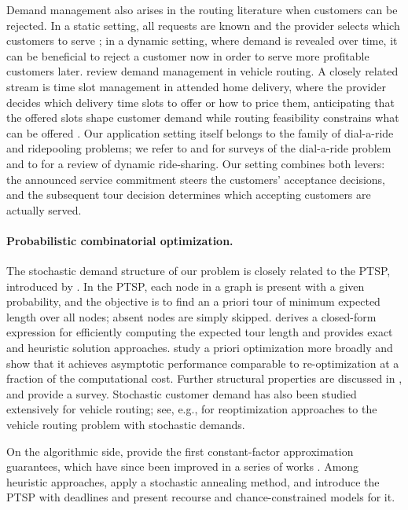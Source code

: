 \documentclass[11pt]{article}
\theoremstyle{plain}
\theoremstyle{definition}
\begin{document}
    Demand management also arises in the routing literature when customers can be rejected. In a static setting, all requests are known and the provider selects which customers to serve \citep{schulz2024using}; in a dynamic setting, where demand is revealed over time, it can be beneficial to reject a customer now in order to serve more profitable customers later. \citet{fleckenstein2023recent} review demand management in vehicle routing. A closely related stream is time slot management in attended home delivery, where the provider decides which delivery time slots to offer or how to price them, anticipating that the offered slots shape customer demand while routing feasibility constrains what can be offered \citep{agatz2011time, klein2019differentiated}. Our application setting itself belongs to the family of dial-a-ride and ridepooling problems; we refer to \citet{ho2018survey} and \citet{molenbruch2017typology} for surveys of the dial-a-ride problem and to \citet{agatz2012optimization} for a review of dynamic ride-sharing. Our setting combines both levers: the announced service commitment steers the customers' acceptance decisions, and the subsequent tour decision determines which accepting customers are actually served.


	\paragraph{Probabilistic combinatorial optimization.}
	The stochastic demand structure of our problem is closely related to the \ac{PTSP}, introduced by \cite{jaillet1985probabilistic}. In the \ac{PTSP}, each node in a graph is present with a given probability, and the objective is to find an a priori tour of minimum expected length over all nodes; absent nodes are simply skipped. \cite{jaillet1985probabilistic} derives a closed-form expression for efficiently computing the expected tour length and provides exact and heuristic solution approaches. \cite{bertsimas1990priori} study a priori optimization more broadly and show that it achieves asymptotic performance comparable to re-optimization at a fraction of the computational cost. Further structural properties are discussed in \cite{bertsimas1993further}, and \cite{henchiri2014probabilistic} provide a survey. Stochastic customer demand has also been studied extensively for vehicle routing; see, e.g., \citet{secomandi2009reoptimization} for reoptimization approaches to the vehicle routing problem with stochastic demands.
	
	On the algorithmic side, \cite{shmoys2008constant} provide the first constant-factor approximation guarantees, which have since been improved in a series of works \citep{van2011deterministic, van2018priori, blauth2025improved}. Among heuristic approaches, \cite{bowler2003characterization} apply a stochastic annealing method, and \cite{campbell2008probabilistic} introduce the \ac{PTSP} with deadlines and present recourse and chance-constrained models for it.
	
\end{document}
